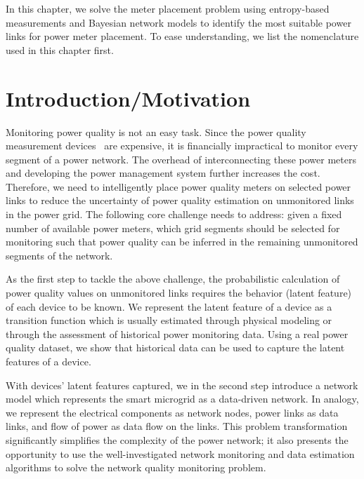 \label{chap:meterPlacement}
In this chapter, we solve the meter placement problem using entropy-based measurements and Bayesian network models to identify the most suitable power links for power meter placement. To ease understanding, we list the nomenclature used in this chapter first. 

\section{Introduction/Motivation}
Monitoring power quality is not an easy task. Since the power quality measurement devices~\cite{schneider_meter} are expensive, it is financially impractical to monitor every segment of a power network. The overhead of interconnecting these power meters and developing the power management system further increases the cost. Therefore, we need to intelligently place power quality meters on selected power links to reduce the uncertainty of power quality estimation on unmonitored links in the power grid. The following core challenge needs to address: given a fixed number of available power meters, which grid segments should be selected for monitoring such that power quality can be inferred in the remaining unmonitored segments of the network.

As the first step to tackle the above challenge, the probabilistic calculation of power quality values on unmonitored links requires the behavior (latent feature) of each device to be known. We represent the latent feature of a device as a transition function which is usually estimated through physical modeling or through the assessment of historical power monitoring data. Using a real power quality dataset, we show that historical data can be used to capture the latent features of a device.

With devices' latent features captured, we in the second step introduce a network model which represents the smart microgrid as a data-driven network. In analogy, we represent the electrical components as network nodes, power links as data links, and flow of power as data flow on the links. This problem transformation significantly simplifies the complexity of the power network; it also presents the opportunity to use the well-investigated network monitoring and data estimation algorithms to solve the network quality monitoring problem.

